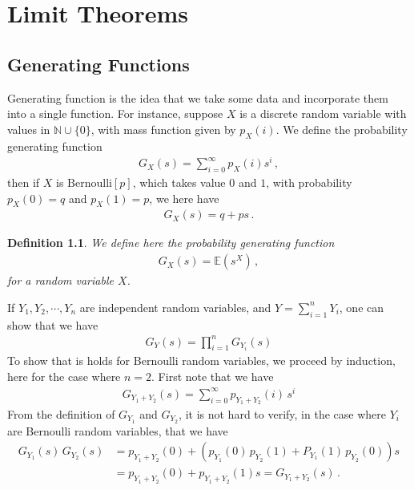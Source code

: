 \documentclass[11pt, onesided]{book}
\theoremstyle{break}
\theoremstyle{break}
\newtheorem{defn}{Definition}[thm]
\newcommand{\N}{\mathbb{N}}
\begin{document}
\chapter{Limit Theorems}
\section[Generating Functions]{\color{red}Generating Functions\color{black}}
Generating function is the idea that we take some data and incorporate them into a single function. For instance, suppose $X$ is a discrete random variable with values in $\N\cup \{0\}$, with mass function given by $p_X(i)$. We define the probability generating function 
\begin{align*}
G_X(s) = \sum_{i=0}^\infty p_X(i) s^i \,,
\end{align*}
then if $X$ is $\text{Bernoulli}[p]$, which takes value $0$ and $1$, with probability $p_X(0) = q$ and $p_X(1) = p$, we here have
\begin{align*}
G_X(s) = q+ps\,.
\end{align*} 
\begin{defn}
We define here the probability generating function
\begin{align*}
G_X(s) = \mathbb{E}(s^X)\,,
\end{align*}
for a random variable $X$.
\end{defn}


If $Y_1,Y_2,\cdots, Y_n$ are independent random variables, and $Y = \sum_{i=1}^n Y_i$, one can show that we have
\begin{align*}
G_{Y}(s) = \prod_{i=1}^n G_{Y_i}(s)
\end{align*}
To show that is holds for Bernoulli random variables, we proceed by induction, here for the case where $n=2$. First note that we have
\begin{align*}
G_{Y_1 + Y_2} (s) = \sum_{i=0}^\infty p_{Y_1 + Y_2}(i) \, s^i
\end{align*}
From the definition of $G_{Y_1}$ and $G_{Y_2}$, it is not hard to verify, in the case where $Y_i$ are Bernoulli random variables, that we have
\begin{align*}
G_{Y_1}(s) \, G_{Y_2}(s) &= p_{Y_1 + Y_2}(0) + \left( p_{Y_1}(0) \, p_{Y_2}(1) + P_{Y_1}(1)\, p_{Y_2}(0)\right) s \\
&=p_{Y_1 + Y_2}(0) + p_{Y_1 + Y_2}(1) s =G_{Y_1 + Y_2}(s)\,.
\end{align*}
\end{document}
